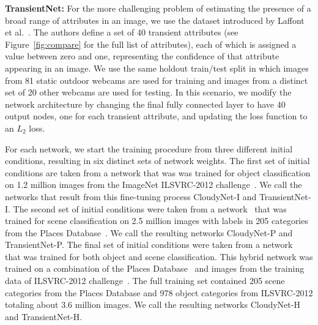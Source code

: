 \documentclass[10pt,twocolumn,letterpaper]{article}
\newcommand{\todo}[1]{\textcolor{red}{todo: {\em #1}}}
\newcommand{\figref}[1]{Figure~\ref{fig:#1}}
\begin{document}
\textbf{TransientNet:} For the more challenging problem of estimating
the presence of a broad range of attributes in an image, we use the dataset introduced by Laffont
et al.~\cite{Laffont14}. The authors define a set of 40 transient attributes
(see \figref{compare} for the full list of attributes), each of which is
assigned a value between zero and one, representing the confidence
of that attribute appearing in an image. We use the same holdout
train/test split in which images from 81 static outdoor webcams are
used for training and images from a distinct set of 20 other webcams are
used for testing.  In this scenario, we modify the network architecture
by changing the final fully connected layer to have 40 output nodes, one for
each transient attribute, and updating the loss function to an $L_2$
loss. 

For each network, we start the training procedure from three different initial conditions,
resulting in six distinct sets of network weights. The first set of initial
conditions are taken from a network that was was trained for object
classification on 1.2 million images from the ImageNet ILSVRC-2012
challenge~\cite{ILSVRCarxiv14}.  We call the networks that result from this
fine-tuning process CloudyNet-I and TransientNet-I.  The second set of initial
conditions were taken from a network~\cite{zhou2014places} that was trained for
scene classification on 2.5 million images with labels in 205 categories from
the Places Database~\cite{zhou2014places}. We call the resulting networks
CloudyNet-P and TransientNet-P.  The final set of initial conditions were taken
from a network~\cite{zhou2014places} that was trained for both object and scene
classification.  This hybrid network was trained on a combination of the Places
Database~\cite{zhou2014places} and images from the training data of ILSVRC-2012
challenge~\cite{ILSVRCarxiv14}.  The full training set contained 205 scene
categories from the Places Database and 978 object categories from ILSVRC-2012
totaling about 3.6 million images.  We call the resulting networks CloudyNet-H
and TransientNet-H.

%
\end{document}
